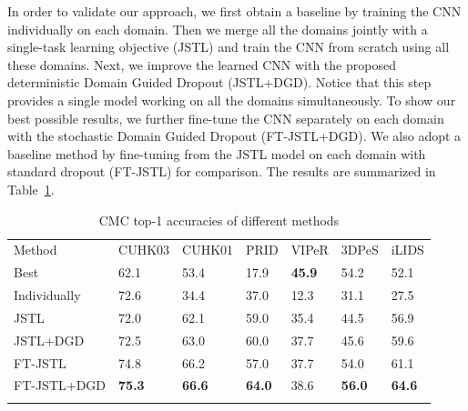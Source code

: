 In order to validate our approach, we first obtain a baseline by training the CNN individually on each domain. Then we merge all the domains jointly with a single-task learning objective (JSTL) and train the CNN from scratch using all these domains. Next, we improve the learned CNN with the proposed deterministic Domain Guided Dropout (JSTL+DGD). Notice that this step provides a single model working on all the domains simultaneously. To show our best possible results, we further fine-tune the CNN separately on each domain with the stochastic Domain Guided Dropout (FT-JSTL+DGD). We also adopt a baseline method by fine-tuning from the JSTL model on each domain with standard dropout (FT-JSTL) for comparison. The results are summarized in Table~\ref{tab:comparison_with_sota}.

\begin{table}[t]
\begin{center}
\begin{tabular}{lllllll}
\hline\noalign{\smallskip}
\noalign{\smallskip}
Method & CUHK03 & CUHK01 & PRID & VIPeR & 3DPeS & iLIDS\\
\noalign{\smallskip}\hline\hline\noalign{\smallskip}
Best & 62.1~\cite{paisitkriangkrai2015learning} & 53.4~\cite{paisitkriangkrai2015learning} & 17.9~\cite{paisitkriangkrai2015learning} & \textbf{45.9}~\cite{paisitkriangkrai2015learning} & 54.2~\cite{xiong2014person} & 52.1~\cite{ding2015deep} \\
Individually & 72.6 & 34.4 & 37.0 & 12.3 & 31.1 & 27.5 \\
JSTL & 72.0 & 62.1 & 59.0 & 35.4 & 44.5 & 56.9 \\
JSTL+DGD & 72.5 & 63.0 & 60.0 & 37.7 & 45.6 & 59.6 \\
FT-JSTL & 74.8 & 66.2 & 57.0 & 37.7 & 54.0 & 61.1 \\
FT-JSTL+DGD & \textbf{75.3} & \textbf{66.6} & \textbf{64.0} & 38.6 & \textbf{56.0} & \textbf{64.6} \\
\hline\noalign{\smallskip}
\end{tabular}
\end{center}
\caption{CMC top-1 accuracies of different methods}
\label{tab:comparison_with_sota}
\end{table}

